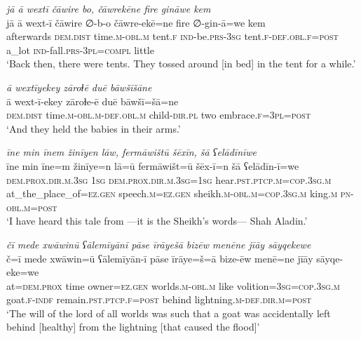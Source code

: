 \ea \label{ZB.19}
\textit{jā ā wextī čāwire bo, čāwrekēne fire gināwe kem} \\ 
\gll jā ā wext-ī čāwire ∅-b-o čāwre-ekē=ne fire ∅-gin-ā=we kem \\ 
 afterwards \textsc{dem.dist} time\textsc{.m}\textsc{-obl}\textsc{.m} tent\textsc{.f} \textsc{ind-}be\textsc{.prs}\textsc{-3sg} tent\textsc{.f}\textsc{-def}\textsc{.obl}\textsc{.f}\textsc{=\textsc{post}} a\_lot \textsc{ind-}fall\textsc{.prs}\textsc{-3pl}\textsc{=compl} little \\ 
\glt `Back then, there were tents. They tossed around [in bed] in the tent for a while.'
\z 
 
\ea \label{ZB.32}
\textit{ā wextīyekey zāroɫē duē bāwšīšāne} \\ 
\gll ā wext-ī-ekey zāroɫe-ē duē bāwšī=šā=ne \\ 
 \textsc{dem.dist} time\textsc{.m}\textsc{-obl}\textsc{.m}\textsc{-def}\textsc{.obl}\textsc{.m} child\textsc{-dir}\textsc{.pl} two embrace\textsc{.f}\textsc{=3pl}\textsc{=\textsc{post}} \\ 
\glt `And they held the babies in their arms.'
\z 
 
\ea \label{ZB.37}
\textit{īne min īnem žinīyen lāw, fermāwištū šēxīn, šā ʕelādīnīwe} \\ 
\gll īne min īne=m žinīye=n lā=ū fermāwišt=ū šēx-ī=n šā ʕelādīn-ī=we \\ 
 \textsc{dem.prox}\textsc{.dir}\textsc{.m}\textsc{.3sg} \textsc{1sg} \textsc{dem.prox}\textsc{.dir}\textsc{.m}\textsc{.3sg}\textsc{=\textsc{1sg}} hear\textsc{.pst}\textsc{.ptcp}\textsc{.m}\textsc{=cop}\textsc{.3sg}\textsc{.m} at\_the\_place\_of\textsc{\textsc{=ez.gen}} speech\textsc{.m}\textsc{\textsc{=ez.gen}} sheikh\textsc{.m}\textsc{-obl}\textsc{.m}\textsc{=cop}\textsc{.3sg}\textsc{.m} king\textsc{.m} \textsc{pn}\textsc{-obl}\textsc{.m}\textsc{=\textsc{post}} \\ 
\glt `I have heard this tale from —it is the Sheikh’s words— Shah Aladin.'
\z 
 
\ea \label{ZB.42}
\textit{čī mede xwāwinū ʕālemīyānī pāse īrāyešā bizēw menēne jīāy sāyqekewe} \\ 
\gll č=ī mede xwāwin=ū ʕālemīyān-ī pāse īrāye=š=ā bize-ēw menē=ne jīāy sāyqe-eke=we \\ 
 at=\textsc{dem.prox} time owner\textsc{\textsc{=ez.gen}} worlds\textsc{.m}\textsc{-obl}\textsc{.m} like volition\textsc{=3sg}\textsc{=cop}\textsc{.3sg}\textsc{.m} goat\textsc{.f}\textsc{-indf} remain\textsc{.pst}\textsc{.ptcp}\textsc{.f}\textsc{=\textsc{post}} behind lightning\textsc{.m}\textsc{-def}\textsc{.dir}\textsc{.m}\textsc{=\textsc{post}} \\ 
\glt `The will of the lord of all worlds was such that a goat was accidentally left behind [healthy] from the lightning [that caused the flood]'
\z 
 
